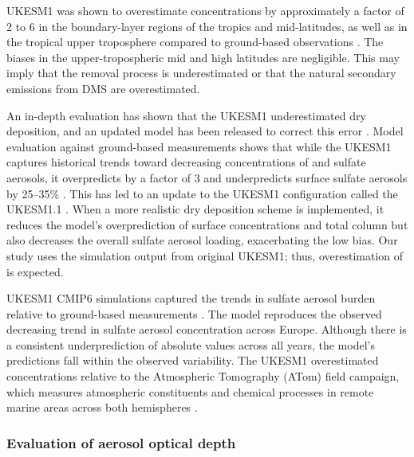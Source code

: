 UKESM1 was shown to overestimate  concentrations by approximately a factor of 2 to 6 in the boundary-layer regions of the tropics and mid-latitudes, as well as in the tropical upper troposphere compared to ground-based observations \citep{hardacreEvaluationSO2SO422021}. The biases in the upper-tropospheric mid and high latitudes are negligible. This may imply that the  removal process is underestimated or that the natural secondary emissions from DMS are overestimated. 

An in-depth evaluation has shown that the UKESM1 underestimated  dry deposition, and an updated model has been released to correct this error \citep{hardacreEvaluationSO2SO422021}. Model evaluation against ground-based measurements shows that while the UKESM1 captures historical trends toward decreasing concentrations of  and sulfate aerosols, it overpredicts  by a factor of 3 and underpredicts surface sulfate aerosols by 25--35\% \citep{hardacreEvaluationSO2SO422021}. This has led to an update to the UKESM1 configuration called the UKESM1.1 \citep{mulcahyUKESM11DevelopmentEvaluation2023}. When a more realistic dry deposition scheme is implemented, it reduces the model’s overprediction of surface  concentrations and total column  but also decreases the overall sulfate aerosol loading, exacerbating the low bias. Our study uses the simulation output from original UKESM1; thus, overestimation of  is expected.


UKESM1 CMIP6 simulations captured the trends in sulfate aerosol burden relative to ground-based measurements \citep{mulcahyDescriptionEvaluationAerosol2020}. The model reproduces the observed decreasing trend in sulfate aerosol concentration across Europe. Although there is a consistent underprediction of absolute values across all years, the model's predictions fall within the observed variability. The UKESM1 overestimated  concentrations relative to the Atmospheric Tomography (ATom) field campaign, which measures atmospheric constituents and chemical processes in remote marine areas across both hemispheres \citep{ranjithkumarConstraintsGlobalAerosol2021}. 


\subsubsection{Evaluation of aerosol optical depth}


